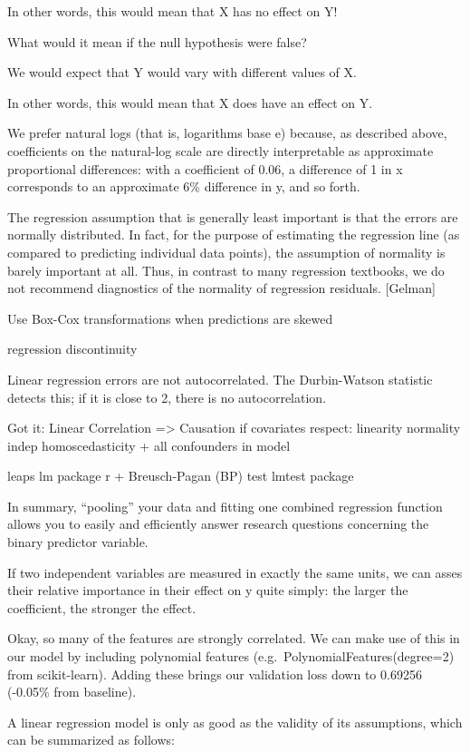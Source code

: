 \documentclass[]{book}
\theoremstyle{definition}
\theoremstyle{definition}
\theoremstyle{definition}
\theoremstyle{remark}
\begin{document}
In other words, this would mean that X has no effect on Y!

What would it mean if the null hypothesis were false?

We would expect that Y would vary with different values of X.

In other words, this would mean that X does have an effect on Y.

We prefer natural logs (that is, logarithms base e) because, as
described above, coefficients on the natural-log scale are directly
interpretable as approximate proportional differences: with a
coefficient of 0.06, a difference of 1 in x corresponds to an
approximate 6\% difference in y, and so forth.

The regression assumption that is generally least important is that the
errors are normally distributed. In fact, for the purpose of estimating
the regression line (as compared to predicting individual data points),
the assumption of normality is barely important at all. Thus, in
contrast to many regression textbooks, we do not recommend diagnostics
of the normality of regression residuals. {[}Gelman{]}

Use Box-Cox transformations when predictions are skewed

regression discontinuity

Linear regression errors are not autocorrelated. The Durbin-Watson
statistic detects this; if it is close to 2, there is no
autocorrelation.

Got it: Linear Correlation =\textgreater{} Causation if covariates
respect: linearity normality indep homoscedasticity + all confounders in
model

leaps lm package r + Breusch-Pagan (BP) test lmtest package

In summary, ``pooling'' your data and fitting one combined regression
function allows you to easily and efficiently answer research questions
concerning the binary predictor variable.

If two independent variables are measured in exactly the same units, we
can asses their relative importance in their effect on y quite simply:
the larger the coefficient, the stronger the effect.

Okay, so many of the features are strongly correlated. We can make use
of this in our model by including polynomial features
(e.g.~PolynomialFeatures(degree=2) from scikit-learn). Adding these
brings our validation loss down to 0.69256 (-0.05\% from baseline).

A linear regression model is only as good as the validity of its
assumptions, which can be summarized as follows:
\end{document}

